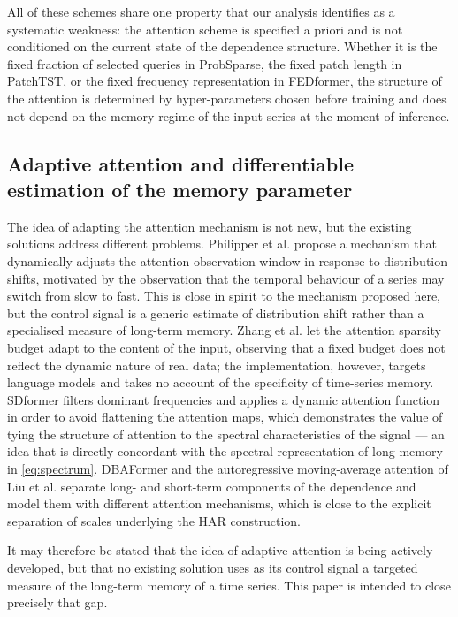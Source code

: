 \documentclass[journal]{IEEEtran}
\begin{document}
All of these schemes share one property that our analysis identifies as a systematic weakness:
the attention scheme is specified a priori and is not conditioned on the current state of the
dependence structure. Whether it is the fixed fraction of selected queries in ProbSparse, the
fixed patch length in PatchTST, or the fixed frequency representation in FEDformer, the structure
of the attention is determined by hyper-parameters chosen before training and does not depend on
the memory regime of the input series at the moment of inference.

\subsection{Adaptive attention and differentiable estimation of the memory parameter}

The idea of adapting the attention mechanism is not new, but the existing solutions address
different problems. Philipper et al. \cite{philipper2024adaptive} propose a mechanism that
dynamically adjusts the attention observation window in response to distribution shifts, motivated
by the observation that the temporal behaviour of a series may switch from slow to fast. This is
close in spirit to the mechanism proposed here, but the control signal is a generic estimate of
distribution shift rather than a specialised measure of long-term memory. Zhang et al.
\cite{zhang2025twilight} let the attention sparsity budget adapt to the content of the input,
observing that a fixed budget does not reflect the dynamic nature of real data; the
implementation, however, targets language models and takes no account of the specificity of
time-series memory. SDformer \cite{zhou2024sdformer} filters dominant frequencies and applies a
dynamic attention function in order to avoid flattening the attention maps, which demonstrates the
value of tying the structure of attention to the spectral characteristics of the signal --- an idea
that is directly concordant with the spectral representation of long memory in
\eqref{eq:spectrum}. DBAFormer \cite{ma2023dbaformer} and the autoregressive moving-average
attention of Liu et al. \cite{liu2024arma} separate long- and short-term components of the
dependence and model them with different attention mechanisms, which is close to the explicit
separation of scales underlying the HAR construction.

It may therefore be stated that the idea of adaptive attention is being actively developed, but
that no existing solution uses as its control signal a targeted measure of the long-term memory of
a time series. This paper is intended to close precisely that gap.
\end{document}
